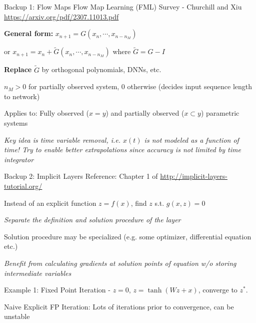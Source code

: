 \documentclass[usenames,dvipsnames]{beamer}
\theoremstyle{definition}
\begin{document}




\begin{frame}{Backup 1: Flow Maps}
Flow Map Learning (FML) Survey - Churchill and Xiu \url{https://arxiv.org/pdf/2307.11013.pdf}

\textbf{General form:} $x_{n + 1} = G(x_n, \cdots, x_{n - n_M})$

or $x_{n + 1} = x_n + \widetilde{G}(x_n, \cdots, x_{n - n_M})$ where $\widetilde{G} = G - I$

\textbf{Replace} $\widetilde{G}$ by orthogonal polynomials, DNNs, etc.

$n_M > 0$ for partially observed system, 0 otherwise (decides input sequence length to network)

Applies to: Fully observed ($x=y$) and partially observed ($x \subset y$) parametric systems

\emph{Key idea is time variable removal, i.e. $x(t)$ is not modeled as a function of time! Try to enable better extrapolations since accuracy is not limited by time integrator}

\end{frame}


\begin{frame}{Backup 2: Implicit Layers}
    Reference: Chapter 1 of \url{http://implicit-layers-tutorial.org/}

    Instead of an explicit function $z = f(x)$, find $z$ s.t. $g(x, z)=0$

    \emph{Separate the definition and solution procedure of the layer}

    Solution procedure may be specialized (e.g. some optimizer, differential equation etc.)

    \emph{Benefit from calculating gradients at solution points of equation w/o storing intermediate variables}

    Example 1: Fixed Point Iteration - $z=0$, $z=\tanh(Wz + x)$, converge to $z^{\ast}$.

    Naive Explicit FP Iteration: Lots of iterations prior to convergence, can be unstable
\end{frame}
\end{document}
